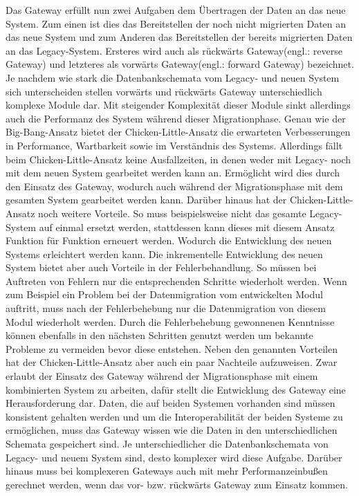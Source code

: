 \lb
Das Gateway erfüllt nun zwei Aufgaben dem Übertragen der Daten an das neue System. Zum einen ist dies das Bereitstellen der noch nicht migrierten Daten an das neue System und zum Anderen das Bereitstellen der bereits migrierten Daten an das Legacy-System. Ersteres wird auch als rückwärts Gateway(engl.: reverse Gateway) und letzteres als vorwärts Gateway(engl.: forward Gateway) bezeichnet.\citep[S. 2]{wuLawless-1997} Je nachdem wie stark die Datenbankschemata vom Legacy- und neuen System sich unterscheiden stellen vorwärts und rückwärts Gateway unterschiedlich komplexe Module dar.  Mit steigender Komplexität dieser Module sinkt allerdings auch die Performanz des System während dieser Migrationphase.\citep[S. 109]{bisbal-1999}
\lb
Genau wie der Big-Bang-Ansatz bietet der Chicken-Little-Ansatz die erwarteten Verbesserungen in Performance, Wartbarkeit sowie im Verständnis des Systems.\citep[S. 108]{bisbal-1999} Allerdings fällt beim Chicken-Little-Ansatz keine Ausfallzeiten, in denen weder mit Legacy- noch mit dem neuen System gearbeitet werden kann an. Ermöglicht wird dies durch den Einsatz des Gateway, wodurch auch während der Migrationsphase mit dem gesamten System gearbeitet werden kann.\citep[S. 2]{wuLawless-1997} Darüber hinaus hat der Chicken-Little-Ansatz noch weitere Vorteile. So muss beispielsweise nicht das gesamte Legacy-System auf einmal ersetzt werden, stattdessen kann dieses mit diesem Ansatz Funktion für Funktion erneuert werden. Wodurch die Entwicklung des neuen Systems erleichtert werden kann.\citep[S. 3]{brodie-1993} Die inkrementelle Entwicklung des neuen System bietet aber auch Vorteile in der Fehlerbehandlung. So müssen bei Auftreten von Fehlern nur die entsprechenden Schritte wiederholt werden. Wenn zum Beispiel ein Problem bei der Datenmigration vom entwickelten Modul auftritt, muss nach der Fehlerbehebung nur die Datenmigration von diesem Modul wiederholt werden. Durch die Fehlerbehebung gewonnenen Kenntnisse können ebenfalls in den nächsten Schritten genutzt werden um bekannte Probleme zu vermeiden bevor diese entstehen.\citep[S. 3]{brodie-1993} 
\lb
Neben den genannten Vorteilen hat der Chicken-Little-Ansatz aber auch ein paar Nachteile aufzuweisen. Zwar erlaubt der Einsatz des Gateway während der Migrationsphase mit einem kombinierten System zu arbeiten, dafür stellt die Entwicklung des Gateway eine Herausforderung dar. Daten, die auf beiden Systemen vorhanden sind müssen konsistent gehalten werden und um die Interoperabilität der beiden Systeme zu ermöglichen, muss das Gateway wissen wie die Daten in den unterschiedlichen Schemata gespeichert sind. Je unterschiedlicher die Datenbankschemata von Legacy- und neuem System sind, desto komplexer wird diese Aufgabe.\citep[S. 2f]{wuLawless-1997} Darüber hinaus muss bei komplexeren Gateways auch mit mehr Performanzeinbußen gerechnet werden, wenn das vor- bzw. rückwärts Gateway zum Einsatz kommen.\citep[S. 109]{bisbal-1999}
